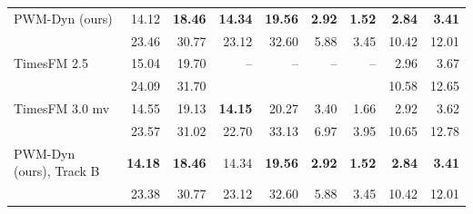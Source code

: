 \begin{table}[t]
\begin{tabular}{@{}lrrrrrrrr@{}}
PWM-Dyn (ours) & 14.12 & \textbf{18.46} & \textbf{14.34} & \textbf{19.56} & \textbf{2.92} & \textbf{1.52} & \textbf{2.84} & \textbf{3.41} \\
 & {\scriptsize 23.46} & {\scriptsize 30.77} & {\scriptsize 23.12} & {\scriptsize 32.60} & {\scriptsize 5.88} & {\scriptsize 3.45} & {\scriptsize 10.42} & {\scriptsize 12.01} \\[1pt]
\midrule
TimesFM 2.5 & 15.04 & 19.70 & -- & -- & -- & -- & 2.96 & 3.67 \\
 & {\scriptsize 24.09} & {\scriptsize 31.70} &  &  &  &  & {\scriptsize 10.58} & {\scriptsize 12.65} \\[1pt]
TimesFM 3.0 mv & 14.55 & 19.13 & \textbf{14.15} & 20.27 & 3.40 & 1.66 & 2.92 & 3.62 \\
 & {\scriptsize 23.57} & {\scriptsize 31.02} & {\scriptsize 22.70} & {\scriptsize 33.13} & {\scriptsize 6.97} & {\scriptsize 3.95} & {\scriptsize 10.65} & {\scriptsize 12.78} \\[1pt]
PWM-Dyn (ours), Track B & \textbf{14.18} & \textbf{18.46} & 14.34 & \textbf{19.56} & \textbf{2.92} & \textbf{1.52} & \textbf{2.84} & \textbf{3.41} \\
 & {\scriptsize 23.38} & {\scriptsize 30.77} & {\scriptsize 23.12} & {\scriptsize 32.60} & {\scriptsize 5.88} & {\scriptsize 3.45} & {\scriptsize 10.42} & {\scriptsize 12.01} \\[1pt]
\bottomrule
\end{tabular}
\end{table}